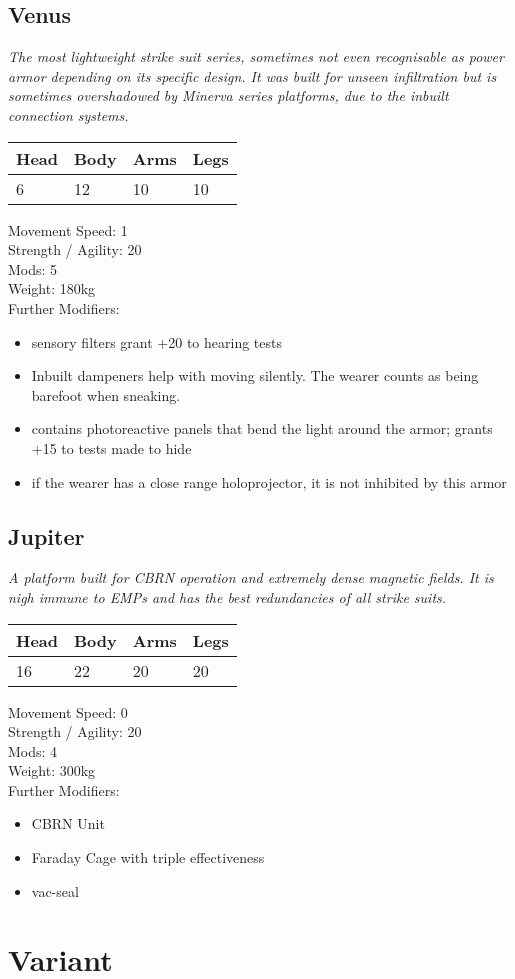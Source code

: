\documentclass[12pt,a4paper,openany]{book}
\begin{document}
	\subsection{Venus}
	\textit{The most lightweight strike suit series, sometimes not even recognisable as power armor depending on its specific design. It was built for unseen infiltration but is sometimes overshadowed by Minerva series platforms, due to the inbuilt connection systems.}\par
	\begin{tabular}{|l|l|l|l|}
		\hline
		Head & Body & Arms & Legs\\
		\hline
		6 & 12 & 10 & 10\\
		\hline
	\end{tabular}
	\par
	Movement Speed: 1\\
	Strength / Agility: 20\\
	Mods: 5\\
	Weight: 180kg\\
	Further Modifiers:
	\vspace{-8mm}
	\begin{itemize}
		\setlength\itemsep{-8mm}
		\item sensory filters grant +20 to hearing tests
		\item Inbuilt dampeners help with moving silently. The wearer counts as being barefoot when sneaking.
		\item contains photoreactive panels that bend the light around the armor; grants +15 to tests made to hide
		\item if the wearer has a close range holoprojector, it is not inhibited by this armor
	\end{itemize}
	\par
	\subsection{Jupiter}
	\textit{A platform built for CBRN operation and extremely dense magnetic fields. It is nigh immune to EMPs and has the best redundancies of all strike suits.}\par
	\begin{tabular}{|l|l|l|l|}
		\hline
		Head & Body & Arms & Legs\\
		\hline
		16 & 22 & 20 & 20\\
		\hline
	\end{tabular}
	\par
	Movement Speed: 0\\
	Strength / Agility: 20\\
	Mods: 4\\
	Weight: 300kg\\
	Further Modifiers:
	\vspace{-8mm}
	\begin{itemize}
		\setlength\itemsep{-8mm}
		\item CBRN Unit
		\item Faraday Cage with triple effectiveness
		\item vac-seal
	\end{itemize}
	\par
	
	\section{Variant}
\end{document}
